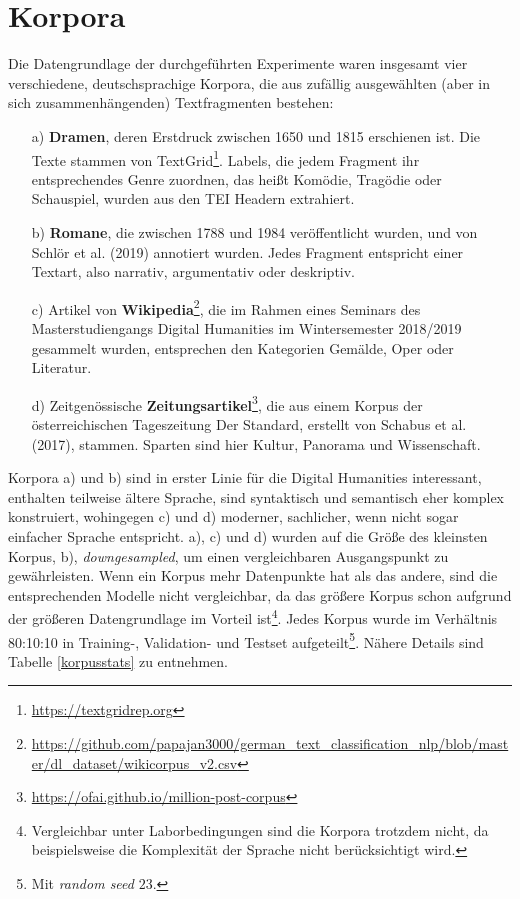 \section{Korpora}
\label{korpora}

Die Datengrundlage der durchgeführten Experimente waren insgesamt vier verschiedene, deutschsprachige Korpora, die aus zufällig ausgewählten (aber in sich zusammenhängenden) Textfragmenten bestehen:


\begin{itemize}
\item[a)] \textbf{Dramen}, deren Erstdruck zwischen 1650 und 1815 erschienen ist. Die Texte stammen von TextGrid\footnote{\url{https://textgridrep.org}}. Labels, die jedem Fragment ihr entsprechendes Genre zuordnen, das heißt Komödie, Tragödie oder Schauspiel, wurden aus den TEI Headern extrahiert.
\item[b)] \textbf{Romane}, die zwischen 1788 und 1984 veröffentlicht wurden, und von Schlör et al. (2019) annotiert wurden. Jedes Fragment entspricht einer Textart, also narrativ, argumentativ oder deskriptiv.
\item[c)] Artikel von \textbf{Wikipedia}\footnote{\url{https://github.com/papajan3000/german_text_classification_nlp/blob/master/dl_dataset/wikicorpus_v2.csv}}, die im Rahmen eines Seminars des Masterstudiengangs Digital Humanities im Wintersemester 2018/2019 gesammelt wurden, entsprechen den Kategorien Gemälde, Oper oder Literatur.
\item[d)] Zeitgenössische \textbf{Zeitungsartikel}\footnote{\url{https://ofai.github.io/million-post-corpus}}, die aus einem Korpus der österreichischen Tageszeitung Der Standard, erstellt von Schabus et al. (2017), stammen. Sparten sind hier Kultur, Panorama und Wissenschaft.
\end{itemize}

Korpora a) und b) sind in erster Linie für die Digital Humanities interessant, enthalten teilweise ältere Sprache, sind syntaktisch und semantisch eher komplex konstruiert, wohingegen c) und d) moderner, sachlicher, wenn nicht sogar einfacher Sprache entspricht. a), c) und d) wurden auf die Größe des kleinsten Korpus, b), \textit{downgesampled}, um einen vergleichbaren Ausgangspunkt zu gewährleisten. Wenn ein Korpus mehr Datenpunkte hat als das andere, sind die entsprechenden Modelle nicht vergleichbar, da das größere Korpus schon aufgrund der größeren Datengrundlage im Vorteil ist\footnote{Vergleichbar unter Laborbedingungen sind die Korpora trotzdem nicht, da beispielsweise die Komplexität der Sprache nicht berücksichtigt wird.}. Jedes Korpus wurde im Verhältnis 80:10:10 in Training-, Validation- und Testset aufgeteilt\footnote{Mit \textit{random seed} $23$.}. Nähere Details sind Tabelle \ref{korpusstats} zu entnehmen.

